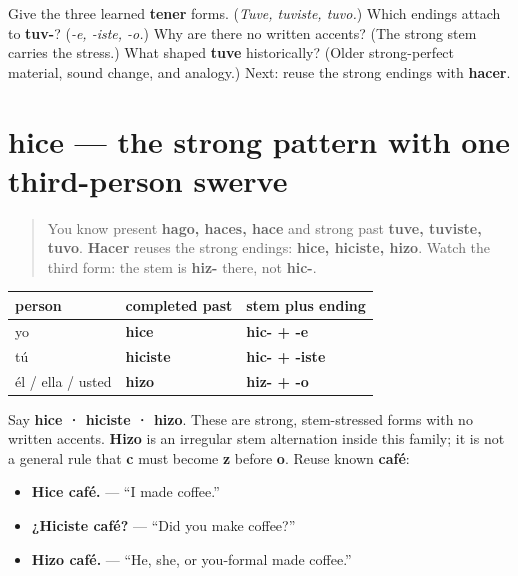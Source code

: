 \begin{tcolorbox}[breakable,colback=teal!4,colframe=teal!35!black,title={Before you move on}]
Give the three learned \textbf{tener} forms. (\emph{Tuve, tuviste, tuvo.}) Which endings attach to \textbf{tuv-}? (\emph{-e, -iste, -o.}) Why are there no written accents? (The strong stem carries the stress.) What shaped \textbf{tuve} historically? (Older strong-perfect material, sound change, and analogy.) Next: reuse the strong endings with \textbf{hacer}.
\end{tcolorbox}
\section[hice]{hice — the strong pattern with one third-person swerve}

\label{lesson:ES-C15-hacer-preterite}



\begin{quote}
You know present \textbf{hago, haces, hace} and strong past \textbf{tuve, tuviste, tuvo}. \textbf{Hacer} reuses the strong endings: \textbf{hice, hiciste, hizo}. Watch the third form: the stem is \textbf{hiz-} there, not \textbf{hic-}.
\end{quote}

\begin{grammarlens}[title={Grammar Lens: hacer in the completed past}]
\noindent
\begin{tabularx}{\linewidth}{@{}>{\raggedright\arraybackslash}X>{\raggedright\arraybackslash}X>{\raggedright\arraybackslash}X@{}}
\toprule
\textbf{person} & \textbf{completed past} & \textbf{stem plus ending} \\
\midrule
yo & \textbf{hice} & \textbf{hic- + -e} \\
tú & \textbf{hiciste} & \textbf{hic- + -iste} \\
él / ella / usted & \textbf{hizo} & \textbf{hiz- + -o} \\
\bottomrule
\end{tabularx}

Say \textbf{hice · hiciste · hizo}. These are strong, stem-stressed forms with no written accents. \textbf{Hizo} is an irregular stem alternation inside this family; it is not a general rule that \textbf{c} must become \textbf{z} before \textbf{o}. Reuse known \textbf{café}:

\begin{itemize}
\raggedright
  \item \textbf{Hice café.} — “I made coffee.”
  \item \textbf{¿Hiciste café?} — “Did you make coffee?”
  \item \textbf{Hizo café.} — “He, she, or you-formal made coffee.”
\end{itemize}
\end{grammarlens}

